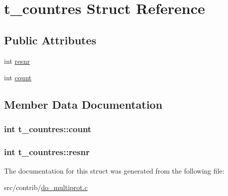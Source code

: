 \hypertarget{structt__countres}{\section{t\-\_\-countres \-Struct \-Reference}
\label{structt__countres}
}
\subsection*{\-Public \-Attributes}
\begin{DoxyCompactItemize}
\item 
int \hyperlink{structt__countres_aeba12a26b28f2c9ceb4fd09d5e590e9e}{resnr}
\item 
int \hyperlink{structt__countres_a18abbcae6418cef713ece42ef43c470d}{count}
\end{DoxyCompactItemize}


\subsection{\-Member \-Data \-Documentation}
\hypertarget{structt__countres_a18abbcae6418cef713ece42ef43c470d}{
\subsubsection[{count}]{\setlength{\rightskip}{0pt plus 5cm}int {\bf t\-\_\-countres\-::count}}}\label{structt__countres_a18abbcae6418cef713ece42ef43c470d}
\hypertarget{structt__countres_aeba12a26b28f2c9ceb4fd09d5e590e9e}{
\subsubsection[{resnr}]{\setlength{\rightskip}{0pt plus 5cm}int {\bf t\-\_\-countres\-::resnr}}}\label{structt__countres_aeba12a26b28f2c9ceb4fd09d5e590e9e}


\-The documentation for this struct was generated from the following file\-:\begin{DoxyCompactItemize}
\item 
src/contrib/\hyperlink{do__multiprot_8c}{do\-\_\-multiprot.\-c}\end{DoxyCompactItemize}
